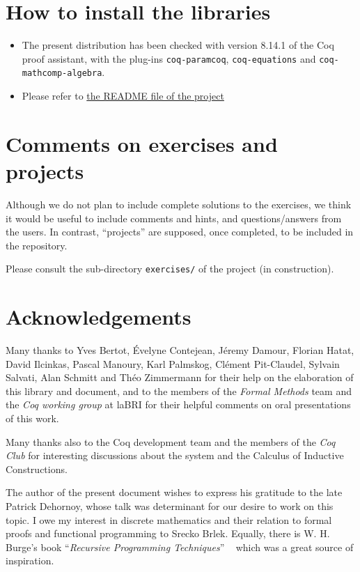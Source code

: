 \documentclass[twoside,a4paper]{book}
\newcounter{snippets}
\begin{document}




\section{How to install the libraries}
\label{sec:orgheadline4}
\begin{itemize}
\item The present distribution has been checked with version 8.14.1 of the Coq proof assistant, with the plug-ins \texttt{coq-paramcoq}, \texttt{coq-equations}
and \texttt{coq-mathcomp-algebra}.

\item Please refer to \href{https://github.com/coq-community/hydra-battles#readme}{the README file of the project}
\end{itemize}

\section{Comments on exercises and projects}

Although we do not plan to include complete solutions to the exercises, 
we think it would be useful to include comments and hints, and questions/answers from the users. In contrast, ``projects'' are supposed, once completed, to be included in the repository.

Please consult the sub-directory \texttt{exercises/} of the
 project (in construction).

\section{Acknowledgements}
\label{sec:orgheadline5}
    Many thanks to Yves Bertot, \'Evelyne Contejean, Jéremy Damour,   Florian Hatat,  David Ilcinkas, 
Pascal Manoury,  Karl Palmskog, Cl\'ement Pit-Claudel, Sylvain Salvati, Alan Schmitt and Théo Zimmermann for their help on the elaboration of this library and  document, and to the
 members of the \emph{Formal Methods} team and the \emph{Coq working group} at laBRI for their helpful comments 
on  oral presentations of this work. 

Many thanks also to the Coq development team and the members of the \emph{Coq Club} for interesting discussions about the \coq{} system and the Calculus of Inductive Constructions.

The author of the present document wishes to express his gratitude to the late Patrick Dehornoy, whose talk  was determinant for our desire to work on this topic.
I owe my interest in discrete mathematics and their relation to formal proofs and functional programming  to Srecko Brlek.  Equally, there is W. H. Burge's book ``\emph{Recursive Programming Techniques}'' ~\cite{burge} which was a great  source of inspiration.
\end{document}
